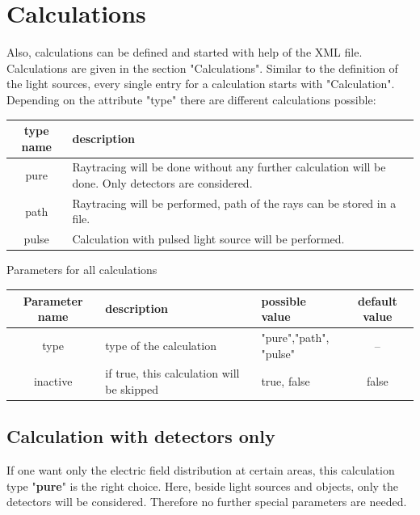 \documentclass[a4paper,html,11pt,openany]{book}
\begin{document}
 \chapter {Calculations}
 Also, calculations can be defined and started with help of the XML file. Calculations are given in the section "Calculations". Similar to the definition of the light sources, every single entry for a calculation starts with "Calculation". Depending on the attribute "type" there are different calculations possible:
 
 \vspace{1em}
 \begin{tabular}{c|m{8cm}}
 type name & description \\
 \hline
 pure & Raytracing will be done without any further calculation will be done. Only detectors are considered.\\
 \hline 
 path & Raytracing will be performed, path of the rays can be stored in a file. \\
  \hline
 pulse & Calculation with pulsed light source will be performed.
 \end{tabular}
 
 \vspace{1em}

 Parameters for all calculations
 \begin{table}[h!]
\fontsize{10pt}{10pt}\selectfont
 \begin{tabular}{c|m{3cm}|m{3cm}|c}
  Parameter name & description  & possible value & default value \\
 \hline
 type & type of the calculation & \parbox{3cm}{"pure","path",\\"pulse"} & -- \\
 \hline
 inactive & if true, this calculation will be skipped & true, false & false \\
 \hline 
 \end{tabular}
 \end{table}

\section{Calculation with detectors only}
If one want only the electric field distribution at certain areas, this calculation type "\textbf{pure}" is the right choice. Here, beside light sources and objects, only the detectors will be considered. Therefore no further special parameters are needed. 
\end{document}
